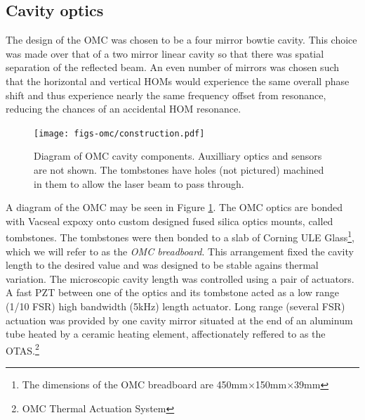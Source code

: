 \subsection{Cavity optics}
The design of the OMC was chosen to be a four mirror bowtie cavity. %
This choice was made over that of a two mirror linear cavity so that there was spatial separation of the reflected beam. %
An even number of mirrors was chosen such that the horizontal and vertical HOMs would experience the same overall phase shift and thus experience nearly the same frequency offset from resonance, reducing the chances of an accidental HOM resonance.

\begin{figure}
  \begin{center}
  \leavevmode
  \texttt{[image: figs-omc/construction.pdf]}
  \end{center}
  \caption[Diagram of OMC cavity components]{Diagram of OMC cavity components. Auxilliary optics and sensors are not shown. The tombstones have holes (not pictured) machined in them to allow the laser beam to pass through.}
  \label{fig:omcconstruction}
\end{figure}

A diagram of the OMC may be seen in Figure \ref{fig:omcconstruction}. %
The OMC optics are bonded with Vacseal expoxy onto custom designed fused silica optics mounts, called tombstones. %
The tombstones were then bonded to a slab of Corning ULE Glass\footnote{The dimensions of the OMC breadboard are 450mm$\times$150mm$\times$39mm}, which we will refer to as the \emph{OMC breadboard}. %
This arrangement fixed the cavity length to the desired value and was designed to be stable agains thermal variation. %
The microscopic cavity length was controlled using a pair of actuators. %
A fast PZT between one of the optics and its tombstone acted as a low range (1/10 FSR) high bandwidth (5kHz) length actuator. %
Long range (several FSR) actuation was provided by one cavity mirror situated at the end of an aluminum tube heated by a ceramic heating element, affectionately reffered to as the OTAS.\footnote{OMC Thermal Actuation System}

